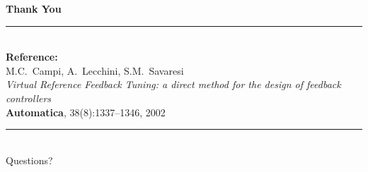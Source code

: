 \documentclass[aspectratio=169]{beamer}
\begin{document}
\begin{frame}[plain]
  \begin{center}
    \vspace{1.5em}
    {\Large\color{darkblue}\textbf{Thank You}}\\[1em]
    \rule{0.5\textwidth}{0.5pt}\\[1em]
    \textbf{Reference:}\\[0.4em]
    M.C.~Campi, A.~Lecchini, S.M.~Savaresi\\
    \textit{Virtual Reference Feedback Tuning: a direct method for the design of feedback controllers}\\
    \textbf{Automatica}, 38(8):1337--1346, 2002\\[1.5em]
    \rule{0.5\textwidth}{0.5pt}\\[0.8em]
    {\small Questions?}
  \end{center}
\end{frame}
\end{document}
